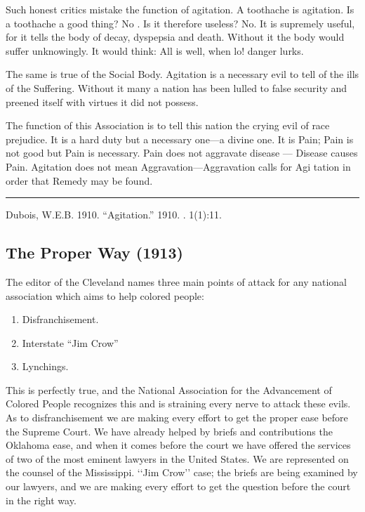 \documentclass[letterpaper,10pt,english]{jupyterBook}
\begin{document}
\sphinxAtStartPar
Such honest critics mistake the function of agitation. A toothache is agitation. Is a toothache a good thing? No . Is it therefore useless? No. It is supremely useful, for it tells the body of decay, dyspepsia and death. Without it the body would suffer unknowingly. It would think: All is well, when lo! danger lurks.

\sphinxAtStartPar
The same is true of the Social Body. Agitation is a necessary evil to tell of the ills of the Suffering. Without it many a nation has been lulled to false security and preened itself with virtues it did not possess.

\sphinxAtStartPar
The function of this Association is to tell this nation the crying evil of race prejudice. It is a hard duty but a necessary one—a divine one. It is Pain; Pain is not good but Pain is necessary. Pain does not aggravate disease — Disease causes Pain. Agitation does not mean Aggravation—Aggravation calls for Agi tation in order that Remedy may be found.


\bigskip\hrule\bigskip


\sphinxAtStartPar
{} Dubois, W.E.B. 1910. “Agitation.”  1910. . 1(1):11.


\subsection{The Proper Way (1913)}
\label{\detokenize{Volumes/05/05/proper_way:the-proper-way-1913}}\label{\detokenize{Volumes/05/05/proper_way::doc}}
\sphinxAtStartPar
The editor of the Cleveland  names three main points of attack for any national association which aims to help colored people:
\begin{enumerate}
%
\item {} 
\sphinxAtStartPar
Disfranchisement.

\item {} 
\sphinxAtStartPar
Interstate “Jim Crow”

\item {} 
\sphinxAtStartPar
Lynchings.

\end{enumerate}

\sphinxAtStartPar
This is perfectly true, and the National Association for the Advancement of Colored People recognizes this and is straining every nerve to attack these evils. As to disfranchisement we are making every effort to get the proper ease before the Supreme Court. We have already helped by briefs and contributions the Oklahoma ease, and when it comes before the court we have offered the services of two of the most eminent lawyers in the United States. We are represented on the counsel of the Mississippi. ‘‘Jim Crow’’ case; the briefs are being examined by our lawyers, and we are making every effort to get the question before the court in the right way.
\end{document}
